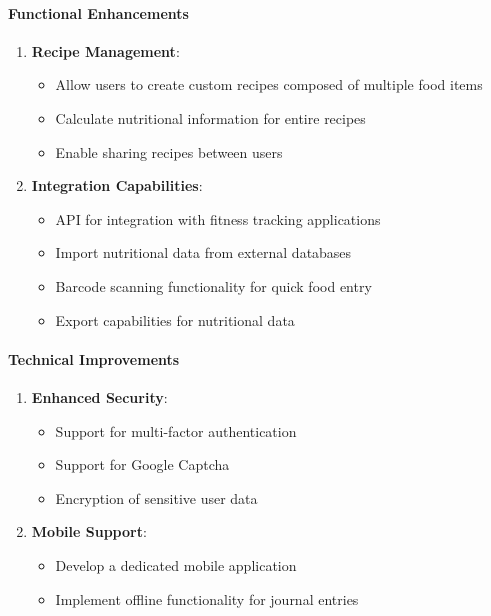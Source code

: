 \documentclass[a4paper,10pt]{article}
\begin{document}
        \paragraph{Functional Enhancements}

        \begin{enumerate}
            \item \textbf{Recipe Management}:
            \begin{itemize}
                \item Allow users to create custom recipes composed of multiple food items
                \item Calculate nutritional information for entire recipes
                \item Enable sharing recipes between users
            \end{itemize}

            \item \textbf{Integration Capabilities}:
            \begin{itemize}
                \item API for integration with fitness tracking applications
                \item Import nutritional data from external databases
                \item Barcode scanning functionality for quick food entry
                \item Export capabilities for nutritional data
            \end{itemize}
        \end{enumerate}

        \paragraph{Technical Improvements}

        \begin{enumerate}
            \item \textbf{Enhanced Security}:
            \begin{itemize}
                \item Support for multi-factor authentication
                \item Support for Google Captcha
                \item Encryption of sensitive user data
            \end{itemize}

            \item \textbf{Mobile Support}:
            \begin{itemize}
                \item Develop a dedicated mobile application
                \item Implement offline functionality for journal entries
            \end{itemize}

        \end{enumerate}
\end{document}
